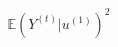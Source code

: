 \documentclass[preview]{standalone}
\begin{document}
\begin{align*}
\mathbb{E}(Y^{(t)} | u^{(1)})^2
\end{align*}
\end{document}
